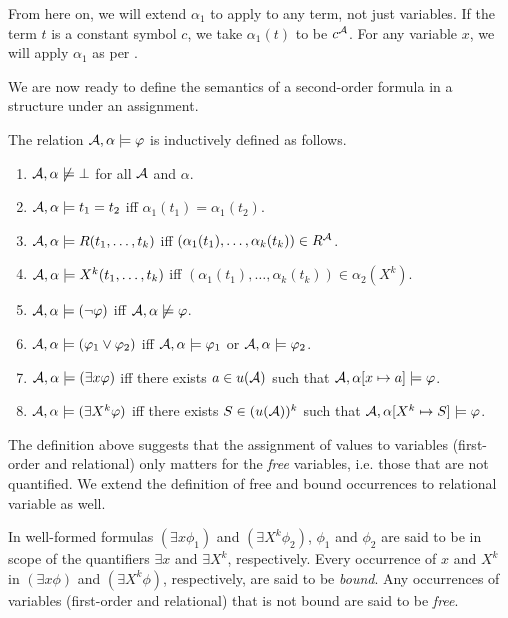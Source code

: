 \documentclass[11pt,twoside=off,numbers=noenddot]{scrbook}
\begin{document}
\begin{abuse}
  From here on, we will extend $\alpha_1$ to apply to any term, not just variables. If the term $t$ is a constant symbol $c$, we take $\alpha_1(t)$ to be $c^{\mathcal{A}}$. For any variable $x$, we will apply $\alpha_1$ as per .
\end{abuse}

We are now ready to define the semantics of a second-order formula in a structure under an assignment.

\begin{definition}
  The relation $\mathcal{A}, \alpha \models \varphi$ is inductively defined as follows.
  \begin{enumerate}
    \item $\mathcal{A}, \alpha \not\models \bot$ for all $\mathcal{A}$ and $\alpha$.
    \item $\mathcal{A}, \alpha \models t_1 = t_2$ iff $\alpha_1(t_1) = \alpha_1(t_2)$.
    \item $\mathcal{A}, \alpha \models R(t_1, \dots, t_k)$ iff $(\alpha_1(t_1), \dots, \alpha_k(t_k)) \in R^{\mathcal{A}}$.
    \item $\mathcal{A}, \alpha \models X^k(t_1, \dots, t_k)$ iff $(\alpha_1(t_1), \dots, \alpha_k(t_k)) \in \alpha_2(X^k)$.
    \item $\mathcal{A}, \alpha \models (\neg \varphi)$ iff $\mathcal{A}, \alpha \not\models \varphi$.
    \item $\mathcal{A}, \alpha \models (\varphi_1 \vee \varphi_2)$ iff $\mathcal{A}, \alpha \models \varphi_1$ or $\mathcal{A}, \alpha \models \varphi_2$.
    \item $\mathcal{A}, \alpha \models (\exists x \varphi)$ iff there exists $a \in u(\mathcal{A})$ such that $\mathcal{A}, \alpha[x \mapsto a] \models \varphi$.
    \item $\mathcal{A}, \alpha \models (\exists X^k \varphi)$ iff there exists $S \in (u(\mathcal{A}))^k$ such that $\mathcal{A}, \alpha[X^k \mapsto S] \models \varphi$.
  \end{enumerate}
\end{definition}

The definition above suggests that the assignment of values to variables (first-order and relational) only matters for the \emph{free} variables, i.e. those that are not quantified. We extend the definition of free and bound occurrences to relational variable as well.

\begin{definition}
  In well-formed formulas $(\exists x \phi_1)$ and $(\exists X^k \phi_2)$, $\phi_1$ and $\phi_2$ are said to be in scope of the quantifiers $\exists x$ and $\exists X^k$, respectively. Every occurrence of $x$ and $X^k$ in $(\exists x \phi)$ and $(\exists X^k \phi)$, respectively, are said to be \emph{bound}. Any occurrences of variables (first-order and relational) that is not bound are said to be \emph{free}.
\end{definition}
\end{document}
